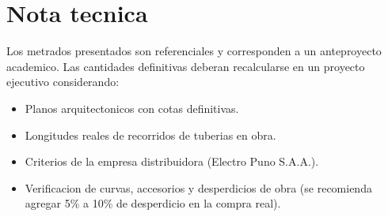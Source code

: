 \section{Nota tecnica}

Los metrados presentados son referenciales y corresponden a un anteproyecto academico. Las cantidades definitivas deberan recalcularse en un proyecto ejecutivo considerando:

\begin{itemize}
  \item Planos arquitectonicos con cotas definitivas.
  \item Longitudes reales de recorridos de tuberias en obra.
  \item Criterios de la empresa distribuidora (Electro Puno S.A.A.).
  \item Verificacion de curvas, accesorios y desperdicios de obra (se recomienda agregar 5\% a 10\% de desperdicio en la compra real).
\end{itemize}
